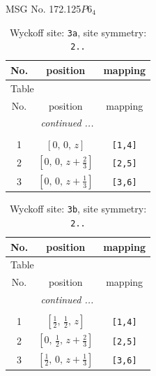\documentclass[fleqn,8pt]{jsarticle}
\begin{document}
\setcounter{MaxMatrixCols}{32}

\renewcommand{\tablename}{Table~}
\renewcommand{\figurename}{Figure~}
\begin{center}
\LARGE
MSG No. 172.125\quad$P6_{4}$
\end{center}
\renewcommand{\arraystretch}{1.2}
\begin{longtable}{ccc}
\caption{Wyckoff site: {\tt 3a}, site symmetry: {\tt 2..}}
 \\
 \hline \hline
No. & position & mapping \\ \hline \endfirsthead

\multicolumn{2}{l}{\tablename\ \thetable{}} \\
 \hline \hline
No. & position & mapping \\ \hline \endhead

 \hline \hline
\multicolumn{2}{r}{\footnotesize\it continued ...} \\ \endfoot

 \hline \hline
\multicolumn{2}{r}{} \\ \endlastfoot

1 & $\left[ 0,\, 0,\, z \right]$ & {\tt [1,4]} \\ \hline
2 & $\left[ 0,\, 0,\, z + \frac{2}{3} \right]$ & {\tt [2,5]} \\ \hline
3 & $\left[ 0,\, 0,\, z + \frac{1}{3} \right]$ & {\tt [3,6]} \\
\end{longtable}
\renewcommand{\arraystretch}{1.2}
\begin{longtable}{ccc}
\caption{Wyckoff site: {\tt 3b}, site symmetry: {\tt 2..}}
 \\
 \hline \hline
No. & position & mapping \\ \hline \endfirsthead

\multicolumn{2}{l}{\tablename\ \thetable{}} \\
 \hline \hline
No. & position & mapping \\ \hline \endhead

 \hline \hline
\multicolumn{2}{r}{\footnotesize\it continued ...} \\ \endfoot

 \hline \hline
\multicolumn{2}{r}{} \\ \endlastfoot

1 & $\left[ \frac{1}{2},\, \frac{1}{2},\, z \right]$ & {\tt [1,4]} \\ \hline
2 & $\left[ 0,\, \frac{1}{2},\, z + \frac{2}{3} \right]$ & {\tt [2,5]} \\ \hline
3 & $\left[ \frac{1}{2},\, 0,\, z + \frac{1}{3} \right]$ & {\tt [3,6]} \\
\end{longtable}
\end{document}
